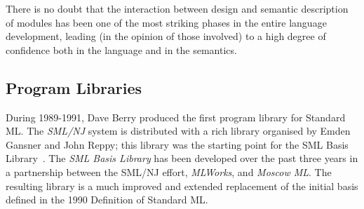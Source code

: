 There is no doubt that the interaction between design and semantic description
of modules has been one of the most striking phases in the entire language
development, leading (in the opinion of those involved) to a high degree of
confidence both in the language and in the semantics.


\subsection*{Program Libraries}
 During 1989-1991, Dave Berry produced the first program library for
 Standard ML\cite{mllib91,berry93}.
 The {\em SML/NJ} system is distributed with a rich library organised by
 Emden Gansner and John Reppy; this library was the starting point for
 the SML Basis Library~.
 The {\em SML Basis Library\/}\cite{mllib96} has been developed 
 over the past three years in a
 partnership between the SML/NJ effort, {\em MLWorks}, and {\em Moscow ML}.
 The resulting library is a much improved and extended 
 replacement of the initial basis defined in the 1990 Definition of 
 Standard ML.
